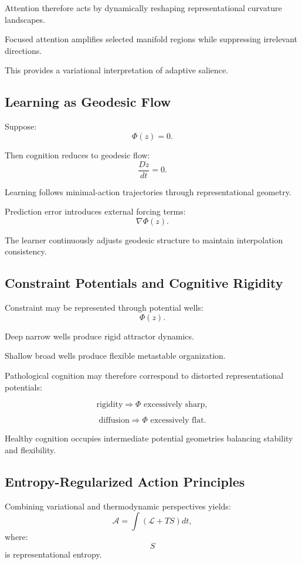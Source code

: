 \documentclass[12pt,a4paper]{article}
\begin{document}
Attention therefore acts by dynamically reshaping representational curvature landscapes.

Focused attention amplifies selected manifold regions while suppressing irrelevant directions.

This provides a variational interpretation of adaptive salience.

\subsection{Learning as Geodesic Flow}

Suppose:
\[
\Phi(z)=0.
\]

Then cognition reduces to geodesic flow:
\[
\frac{D\dot{z}}{dt}
=
0.
\]

Learning follows minimal-action trajectories through representational geometry.

Prediction error introduces external forcing terms:
\[
\nabla \Phi(z).
\]

The learner continuously adjusts geodesic structure to maintain interpolation consistency.

\subsection{Constraint Potentials and Cognitive Rigidity}

Constraint may be represented through potential wells:
\[
\Phi(z).
\]

Deep narrow wells produce rigid attractor dynamics.

Shallow broad wells produce flexible metastable organization.

Pathological cognition may therefore correspond to distorted representational potentials:

\[
\text{rigidity}
\Rightarrow
\Phi
\text{ excessively sharp},
\]

\[
\text{diffusion}
\Rightarrow
\Phi
\text{ excessively flat}.
\]

Healthy cognition occupies intermediate potential geometries balancing stability and flexibility.

\subsection{Entropy-Regularized Action Principles}

Combining variational and thermodynamic perspectives yields:
\[
\mathcal{A}
=
\int
(
\mathcal{L}
+
TS
)
dt,
\]
where:
\[
S
\]
is representational entropy.
\end{document}
